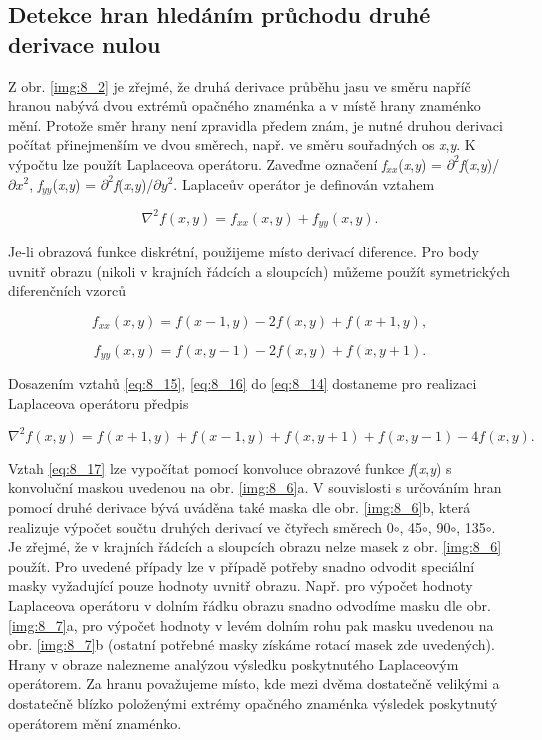 \subsection*{Detekce hran hledáním průchodu druhé derivace nulou}

Z obr. \ref{img:8_2} je zřejmé, že druhá derivace průběhu jasu ve směru napříč hranou nabývá dvou extrémů opačného znaménka a v místě hrany znaménko mění. Protože směr hrany není zpravidla předem znám, je nutné druhou derivaci počítat přinejmenším ve dvou směrech, např. ve směru souřadných os \textit{x},\textit{y}. K výpočtu lze použít Laplaceova operátoru. Zaveďme označení \textit{f}$_{xx}$(\textit{x},\textit{y}) = $\partial^2$\textit{f}(\textit{x},\textit{y})/$\partial x^2$, \textit{f}$_{yy}$(\textit{x},\textit{y}) = $\partial^2$\textit{f}(\textit{x},\textit{y})/$\partial y^2$. Laplaceův operátor je definován vztahem

\begin{equation} \label{eq:8_14}
    \nabla^2 f(x,y)=f_{xx} (x,y) + f_{yy} (x,y).
\end{equation}

Je-li obrazová funkce diskrétní, použijeme místo derivací diference. Pro body uvnitř obrazu (nikoli v krajních řádcích a sloupcích) můžeme použít symetrických diferenčních vzorců

\begin{equation} \label{eq:8_15}
    f_{xx} (x,y)=f(x-1,y)-2f(x,y)+f(x+1,y),
\end{equation}

\begin{equation} \label{eq:8_16}
    f_{yy} (x,y)=f(x,y-1)-2f(x,y)+f(x,y+1).
\end{equation}

Dosazením vztahů \eqref{eq:8_15}, \eqref{eq:8_16} do \eqref{eq:8_14} dostaneme pro realizaci Laplaceova operátoru předpis

\begin{equation} \label{eq:8_17}
    \nabla^2 f(x,y)=f(x+1,y)+f(x-1,y)+f(x,y+1)+f(x,y-1)-4f(x,y).
\end{equation}

Vztah \eqref{eq:8_17} lze vypočítat pomocí konvoluce obrazové funkce \textit{f}(\textit{x},\textit{y}) s konvoluční maskou uvedenou na obr. \ref{img:8_6}a. V souvislosti s určováním hran pomocí druhé derivace bývá uváděna také maska dle obr. \ref{img:8_6}b, která realizuje výpočet součtu druhých derivací ve čtyřech směrech 0$\circ$, 45$\circ$, 90$\circ$, 135$\circ$. Je zřejmé, že v krajních řádcích a sloupcích obrazu nelze masek z obr. \ref{img:8_6} použít. Pro uvedené případy lze v případě potřeby snadno odvodit speciální masky vyžadující pouze hodnoty uvnitř obrazu. Např. pro výpočet hodnoty Laplaceova operátoru v dolním řádku obrazu snadno odvodíme masku dle obr. \ref{img:8_7}a, pro výpočet hodnoty v levém dolním rohu pak masku uvedenou na obr. \ref{img:8_7}b (ostatní potřebné masky získáme rotací masek zde uvedených). Hrany v obraze nalezneme analýzou výsledku poskytnutého Laplaceovým operátorem. Za hranu považujeme místo, kde mezi dvěma dostatečně velikými a dostatečně blízko položenými extrémy opačného znaménka výsledek poskytnutý operátorem mění znaménko.

